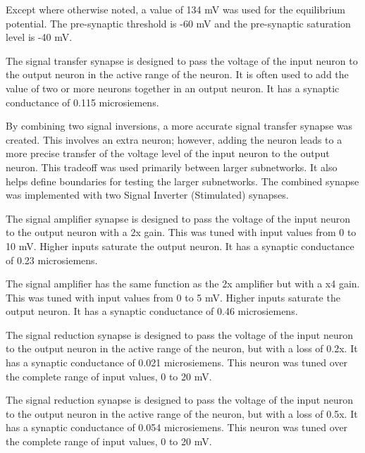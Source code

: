 
Except where otherwise noted, a value of 134 mV was used for the equilibrium
potential. The pre-synaptic threshold is -60 mV and the pre-synaptic saturation
level is -40 mV.


The signal transfer synapse is designed to pass the voltage of the input neuron
to the output neuron in the active range of the neuron. It is often used to add
the value of two or more neurons together in an output neuron.
It has a synaptic 
conductance of 0.115 microsiemens. 


By combining two signal inversions, a more accurate signal transfer synapse was
created. This involves an extra neuron; however, adding the neuron leads to a more precise
transfer of the voltage level of the input neuron to the output neuron. This tradeoff was used primarily between larger subnetworks. It also helps define boundaries for testing the larger subnetworks. The combined synapse was implemented with two Signal Inverter (Stimulated)
synapses.


The signal amplifier synapse is designed to pass the voltage of the input neuron
to the output neuron with a 2x gain. This was tuned with input values from 0 to
10 mV. Higher inputs saturate the output neuron. It has a synaptic conductance
of 0.23 microsiemens.


The signal amplifier has the same function as the 2x amplifier but with a x4 
gain. This was tuned with input values from 0 to
5 mV. Higher inputs saturate the output neuron. It has a synaptic conductance
of 0.46 microsiemens.


The signal reduction synapse is designed to pass the voltage of the input neuron
to the output neuron in the active range of the neuron, but with a loss of 0.2x. 
It has a synaptic  conductance of 0.021 microsiemens. This neuron was tuned
over the complete range of input values, 0 to 20 mV.


The signal reduction synapse is designed to pass the voltage of the input neuron
to the output neuron in the active range of the neuron, but with a loss of 0.5x. 
It has a synaptic  conductance of 0.054 microsiemens. This neuron was tuned
over the complete range of input values, 0 to 20 mV.

